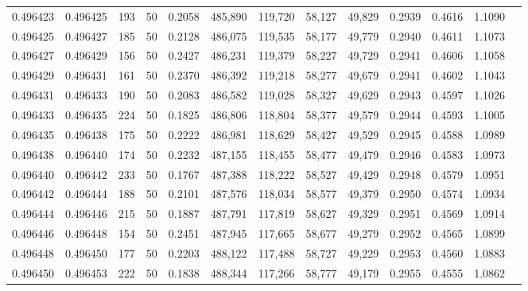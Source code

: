\begin{tabular}{rrrrrrrrrrrrr}
0.496423 & 0.496425 &   193 &  50 &                                     0.2058 & 485,890 & 119,720 &  58,127 &  49,829 & 0.2939 & 0.4616 & 1.1090 \\
0.496425 & 0.496427 &   185 &  50 &                                     0.2128 & 486,075 & 119,535 &  58,177 &  49,779 & 0.2940 & 0.4611 & 1.1073 \\
0.496427 & 0.496429 &   156 &  50 &                                     0.2427 & 486,231 & 119,379 &  58,227 &  49,729 & 0.2941 & 0.4606 & 1.1058 \\
0.496429 & 0.496431 &   161 &  50 &                                     0.2370 & 486,392 & 119,218 &  58,277 &  49,679 & 0.2941 & 0.4602 & 1.1043 \\
0.496431 & 0.496433 &   190 &  50 &                                     0.2083 & 486,582 & 119,028 &  58,327 &  49,629 & 0.2943 & 0.4597 & 1.1026 \\
0.496433 & 0.496435 &   224 &  50 &                                     0.1825 & 486,806 & 118,804 &  58,377 &  49,579 & 0.2944 & 0.4593 & 1.1005 \\
0.496435 & 0.496438 &   175 &  50 &                                     0.2222 & 486,981 & 118,629 &  58,427 &  49,529 & 0.2945 & 0.4588 & 1.0989 \\
0.496438 & 0.496440 &   174 &  50 &                                     0.2232 & 487,155 & 118,455 &  58,477 &  49,479 & 0.2946 & 0.4583 & 1.0973 \\
0.496440 & 0.496442 &   233 &  50 &                                     0.1767 & 487,388 & 118,222 &  58,527 &  49,429 & 0.2948 & 0.4579 & 1.0951 \\
0.496442 & 0.496444 &   188 &  50 &                                     0.2101 & 487,576 & 118,034 &  58,577 &  49,379 & 0.2950 & 0.4574 & 1.0934 \\
0.496444 & 0.496446 &   215 &  50 &                                     0.1887 & 487,791 & 117,819 &  58,627 &  49,329 & 0.2951 & 0.4569 & 1.0914 \\
0.496446 & 0.496448 &   154 &  50 &                                     0.2451 & 487,945 & 117,665 &  58,677 &  49,279 & 0.2952 & 0.4565 & 1.0899 \\
0.496448 & 0.496450 &   177 &  50 &                                     0.2203 & 488,122 & 117,488 &  58,727 &  49,229 & 0.2953 & 0.4560 & 1.0883 \\
0.496450 & 0.496453 &   222 &  50 &                                     0.1838 & 488,344 & 117,266 &  58,777 &  49,179 & 0.2955 & 0.4555 & 1.0862 \\

\end{tabular}
